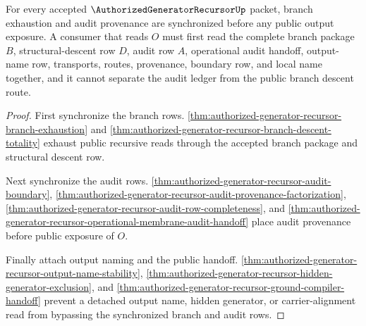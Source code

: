 \begin{theorem}
\label{thm:authorized-generator-recursor-audit-branch-synchronization}
For every accepted $\AuthorizedGeneratorRecursorUp$ packet, branch exhaustion and audit provenance are synchronized before any public output exposure. A consumer that reads $O$ must first read the complete branch package $B$, structural-descent row $D$, audit row $A$, operational audit handoff, output-name row, transports, routes, provenance, boundary row, and local name together, and it cannot separate the audit ledger from the public branch descent route.
\end{theorem}
\begin{proof}
First synchronize the branch rows. \autoref{thm:authorized-generator-recursor-branch-exhaustion} and \autoref{thm:authorized-generator-recursor-branch-descent-totality} exhaust public recursive reads through the accepted branch package and structural descent row.

Next synchronize the audit rows. \autoref{thm:authorized-generator-recursor-audit-boundary}, \autoref{thm:authorized-generator-recursor-audit-provenance-factorization}, \autoref{thm:authorized-generator-recursor-audit-row-completeness}, and \autoref{thm:authorized-generator-recursor-operational-membrane-audit-handoff} place audit provenance before public exposure of $O$.

Finally attach output naming and the public handoff. \autoref{thm:authorized-generator-recursor-output-name-stability}, \autoref{thm:authorized-generator-recursor-hidden-generator-exclusion}, and \autoref{thm:authorized-generator-recursor-ground-compiler-handoff} prevent a detached output name, hidden generator, or carrier-alignment read from bypassing the synchronized branch and audit rows.
\end{proof}

